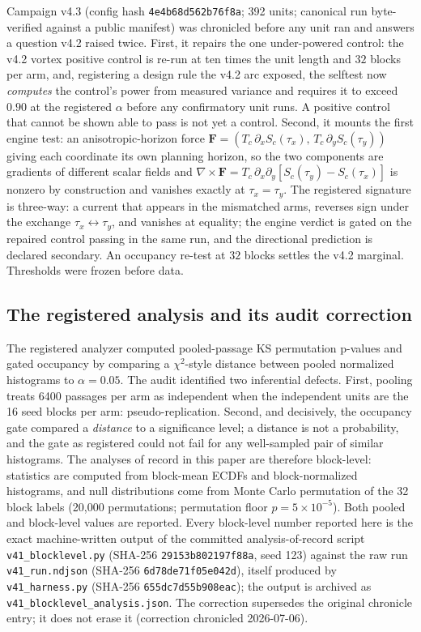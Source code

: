 \documentclass[11pt]{article}
\begin{document}
Campaign v4.3 (config hash \texttt{4e4b68d562b76f8a}; 392 units; canonical run byte-verified against a public manifest) was chronicled before any unit ran and answers a question v4.2 raised twice. First, it repairs the one under-powered control: the v4.2 vortex positive control is re-run at ten times the unit length and $32$ blocks per arm, and, registering a design rule the v4.2 arc exposed, the selftest now \emph{computes} the control's power from measured variance and requires it to exceed $0.90$ at the registered $\alpha$ before any confirmatory unit runs. A positive control that cannot be shown able to pass is not yet a control. Second, it mounts the first engine test: an anisotropic-horizon force $\mathbf{F} = (T_c\,\partial_x S_c(\tau_x),\, T_c\,\partial_y S_c(\tau_y))$ giving each coordinate its own planning horizon, so the two components are gradients of different scalar fields and $\nabla \times \mathbf{F} = T_c\,\partial_x\partial_y[S_c(\tau_y) - S_c(\tau_x)]$ is nonzero by construction and vanishes exactly at $\tau_x = \tau_y$. The registered signature is three-way: a current that appears in the mismatched arms, reverses sign under the exchange $\tau_x \leftrightarrow \tau_y$, and vanishes at equality; the engine verdict is gated on the repaired control passing in the same run, and the directional prediction is declared secondary. An occupancy re-test at $32$ blocks settles the v4.2 marginal. Thresholds were frozen before data.

\subsection{The registered analysis and its audit correction}\label{sec:audit-method}
The registered analyzer computed pooled-passage KS permutation p-values and gated occupancy by comparing a $\chi^2$-style distance between pooled normalized histograms to $\alpha{=}0.05$. The audit identified two inferential defects. First, pooling treats 6400 passages per arm as independent when the independent units are the 16 seed blocks per arm: pseudo-replication. Second, and decisively, the occupancy gate compared a \emph{distance} to a significance level; a distance is not a probability, and the gate as registered could not fail for any well-sampled pair of similar histograms. The analyses of record in this paper are therefore block-level: statistics are computed from block-mean ECDFs and block-normalized histograms, and null distributions come from Monte Carlo permutation of the 32 block labels (20{,}000 permutations; permutation floor $p = 5\times10^{-5}$). Both pooled and block-level values are reported. Every block-level number reported here is the exact machine-written output of the committed analysis-of-record script \texttt{v41\_blocklevel.py} (SHA-256 \texttt{29153b802197f88a}, seed 123) against the raw run \texttt{v41\_run.ndjson} (SHA-256 \texttt{6d78de71f05e042d}), itself produced by \texttt{v41\_harness.py} (SHA-256 \texttt{655dc7d55b908eac}); the output is archived as \texttt{v41\_blocklevel\_analysis.json}. The correction supersedes the original chronicle entry; it does not erase it (correction chronicled 2026-07-06).
\end{document}
